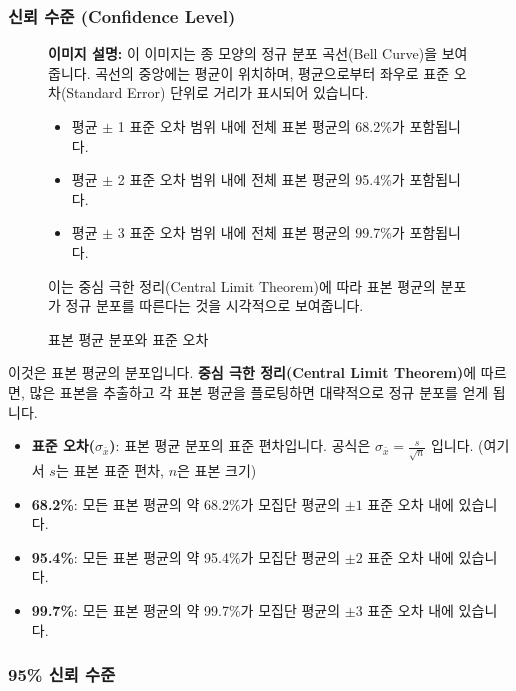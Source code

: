\documentclass[11pt,a4paper]{article}
\begin{document}
\subsubsection*{신뢰 수준 (Confidence Level)}

\begin{figure}[h!]
  \centering
  \begin{tcolorbox}[colback=gray!10, colframe=gray!50, title=\textbf{표본 평균 분포 (이미지 설명)}, sharp corners]
    \textbf{이미지 설명:} 이 이미지는 종 모양의 정규 분포 곡선(Bell Curve)을 보여줍니다.
    곡선의 중앙에는 평균이 위치하며, 평균으로부터 좌우로 표준 오차(Standard Error) 단위로 거리가 표시되어 있습니다.
    \begin{itemize}
        \item 평균 $\pm$ 1 표준 오차 범위 내에 전체 표본 평균의 68.2\%가 포함됩니다.
        \item 평균 $\pm$ 2 표준 오차 범위 내에 전체 표본 평균의 95.4\%가 포함됩니다.
        \item 평균 $\pm$ 3 표준 오차 범위 내에 전체 표본 평균의 99.7\%가 포함됩니다.
    \end{itemize}
    이는 중심 극한 정리(Central Limit Theorem)에 따라 표본 평균의 분포가 정규 분포를 따른다는 것을 시각적으로 보여줍니다.
  \end{tcolorbox}
  \caption{표본 평균 분포와 표준 오차}
  \label{fig:sample_mean_distribution}
\end{figure}

이것은 표본 평균의 분포입니다. \textbf{중심 극한 정리(Central Limit Theorem)}에 따르면, 많은 표본을 추출하고 각 표본 평균을 플로팅하면 대략적으로 정규 분포를 얻게 됩니다.

\begin{itemize}
    \item \textbf{표준 오차($\sigma_{\bar{x}}$)}: 표본 평균 분포의 표준 편차입니다. 공식은 $\sigma_{\bar{x}} = \frac{s}{\sqrt{n}}$ 입니다. (여기서 $s$는 표본 표준 편차, $n$은 표본 크기)
    \item \textbf{68.2\%}: 모든 표본 평균의 약 68.2\%가 모집단 평균의 $\pm 1$ 표준 오차 내에 있습니다.
    \item \textbf{95.4\%}: 모든 표본 평균의 약 95.4\%가 모집단 평균의 $\pm 2$ 표준 오차 내에 있습니다.
    \item \textbf{99.7\%}: 모든 표본 평균의 약 99.7\%가 모집단 평균의 $\pm 3$ 표준 오차 내에 있습니다.
\end{itemize}

\subsubsection*{95\% 신뢰 수준}
\end{document}
